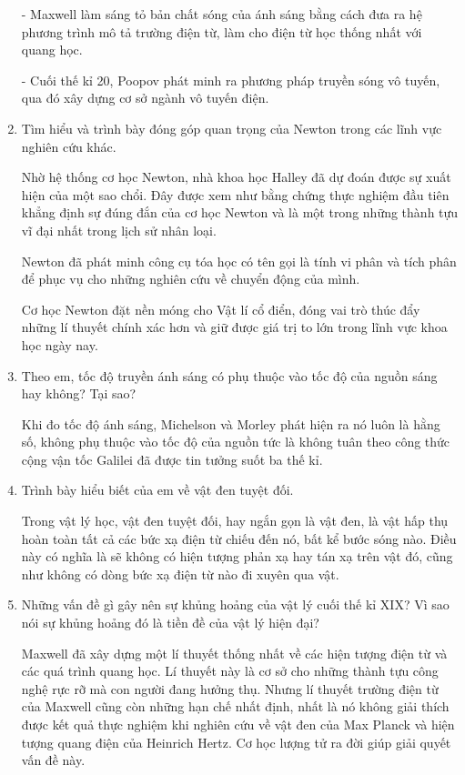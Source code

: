 \begin{enumerate}[label=\bfseries Câu \arabic*:]
{		- Maxwell làm sáng tỏ bản chất sóng của ánh sáng bằng cách đưa ra hệ phương trình mô tả trường điện từ, làm cho điện từ học thống nhất với quang học.
		
		- Cuối thế kỉ 20, Poopov phát minh ra phương pháp truyền sóng vô tuyến, qua đó xây dựng cơ sở ngành vô tuyến điện.
		
	}
	
	\item {}
	
	
	{
		Tìm hiểu và trình bày đóng góp quan trọng của Newton trong các lĩnh vực nghiên cứu khác.
		
	}
	
	\hideall
	{
		Nhờ hệ thống cơ học Newton, nhà khoa học Halley đã dự đoán được sự xuất hiện của một sao chổi. Đây được xem như bằng chứng thực nghiệm đầu tiên khẳng định sự đúng đắn của cơ học Newton và là một trong những thành tựu vĩ đại nhất trong lịch sử nhân loại.
		
		Newton đã phát minh công cụ tóa học có tên gọi là tính vi phân và tích phân để phục vụ cho những nghiên cứu về chuyển động của mình.
		
		Cơ học Newton đặt nền móng cho Vật lí cổ điển, đóng vai trò thúc đẩy những lí thuyết chính xác hơn và giữ được giá trị to lớn trong lĩnh vực khoa học ngày nay.
	}
	\item {}
	
	
	{
		Theo em, tốc độ truyền ánh sáng có phụ thuộc vào tốc độ của nguồn sáng hay không? Tại sao?
	}
	
	\hideall
	{
		Khi đo tốc độ ánh sáng, Michelson và Morley phát hiện ra nó luôn là hằng số, không phụ thuộc vào tốc độ của nguồn tức là không tuân theo công thức cộng vận tốc Galilei đã được tin tưởng suốt ba thế kỉ. 
	}
	\item {}
	
	
	{
		Trình bày hiểu biết của em về vật đen tuyệt đối. 
	}
	
	\hideall
	{
		Trong vật lý học, vật đen tuyệt đối, hay ngắn gọn là vật đen, là vật hấp thụ hoàn toàn tất cả các bức xạ điện từ chiếu đến nó, bất kể bước sóng nào. Điều này có nghĩa là sẽ không có hiện tượng phản xạ hay tán xạ trên vật đó, cũng như không có dòng bức xạ điện từ nào đi xuyên qua vật.
		
		
	}
	\item {}
	
	
	{
		Những vấn đề gì gây nên sự khủng hoảng của vật lý cuối thế kỉ XIX? Vì sao nói sự khủng hoảng đó là tiền đề của vật lý hiện đại?
	}
	
	\hideall
	{
		Maxwell đã xây dựng một lí thuyết thống nhất về các hiện tượng điện từ và các quá trình quang học. Lí thuyết này là cơ sở cho những thành tựu công nghệ rực rỡ mà con người đang hưởng thụ. Nhưng lí thuyết trường điện từ của Maxwell cũng còn những hạn chế nhất định, nhất là nó không giải thích được kết quả thực nghiệm khi nghiên cứu về vật đen của Max Planck và hiện tượng quang điện của Heinrich Hertz. Cơ học lượng tử ra đời giúp giải quyết vấn đề này.
	}
\end{enumerate}